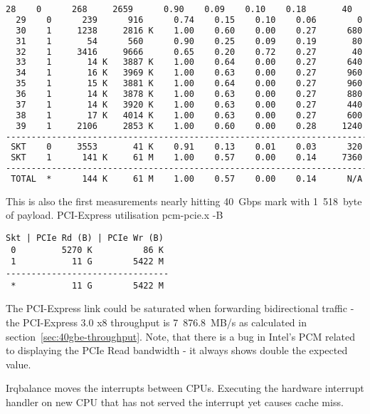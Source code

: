 \begin{lstlisting}[language=TeX]
  28    0      268     2659      0.90    0.09    0.10    0.18       40
  29    0      239      916      0.74    0.15    0.10    0.06        0
  30    1     1238     2816 K    1.00    0.60    0.00    0.27      680
  31    1       54      560      0.90    0.25    0.09    0.19       80
  32    1     3416     9666      0.65    0.20    0.72    0.27       40
  33    1       14 K   3887 K    1.00    0.64    0.00    0.27      640
  34    1       16 K   3969 K    1.00    0.63    0.00    0.27      960
  35    1       15 K   3881 K    1.00    0.64    0.00    0.27      960
  36    1       14 K   3878 K    1.00    0.63    0.00    0.27      880
  37    1       14 K   3920 K    1.00    0.63    0.00    0.27      440
  38    1       17 K   4014 K    1.00    0.63    0.00    0.27      600
  39    1     2106     2853 K    1.00    0.60    0.00    0.28     1240
------------------------------------------------------------------------
 SKT    0     3553       41 K    0.91    0.13    0.01    0.03      320
 SKT    1      141 K     61 M    1.00    0.57    0.00    0.14     7360
------------------------------------------------------------------------
 TOTAL  *      144 K     61 M    1.00    0.57    0.00    0.14      N/A 
\end{lstlisting}


This is also the first measurements nearly hitting 40~Gbps mark with 1~518~byte of payload.
PCI-Express utilisation
pcm-pcie.x -B
\begin{lstlisting}
Skt | PCIe Rd (B) | PCIe Wr (B)
 0         5270 K          86 K
 1           11 G        5422 M
--------------------------------
 *           11 G        5422 M
\end{lstlisting}
The PCI-Express link could be saturated when forwarding bidirectional traffic
- the PCI-Express 3.0 x8 throughput is 7~876.8~MB/s as calculated in section~\ref{sec:40gbe-throughput}.
Note, that there is a bug in Intel's PCM related to displaying
the PCIe Read bandwidth - it always shows double the expected value.




Irqbalance moves the interrupts between CPUs.
Executing the hardware interrupt handler on new CPU that has not served the interrupt yet causes cache miss.

